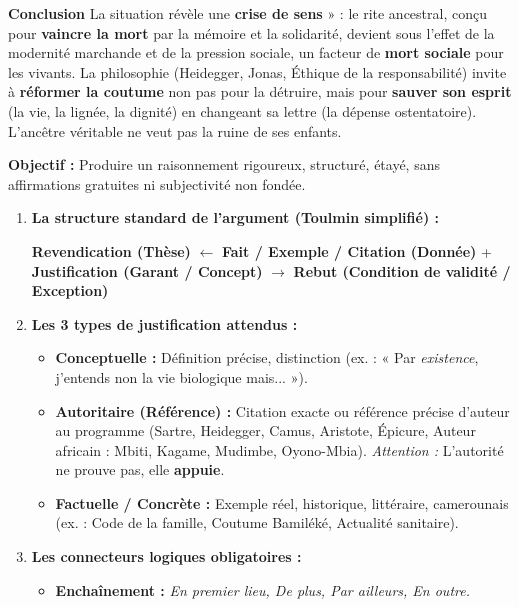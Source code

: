 \documentclass[11pt]{article}
\begin{document}
\begin{exoresolu}
\textbf{Conclusion}
La situation révèle une \textbf{crise de sens} » : le rite ancestral, conçu pour \textbf{vaincre la mort} par la mémoire et la solidarité, devient sous l'effet de la modernité marchande et de la pression sociale, un facteur de \textbf{mort sociale} pour les vivants. La philosophie (Heidegger, Jonas, Éthique de la responsabilité) invite à \textbf{réformer la coutume} non pas pour la détruire, mais pour \textbf{sauver son esprit} (la vie, la lignée, la dignité) en changeant sa lettre (la dépense ostentatoire). L'ancêtre véritable ne veut pas la ruine de ses enfants.
\end{exoresolu}

\begin{methode}
\textbf{Objectif :} Produire un raisonnement rigoureux, structuré, étayé, sans affirmations gratuites ni subjectivité non fondée.
\begin{enumerate}
    \item \textbf{La structure standard de l'argument (Toulmin simplifié) :}
    \begin{center}
    \textbf{Revendication (Thèse)} $\leftarrow$ \textbf{Fait / Exemple / Citation (Donnée)} + \textbf{Justification (Garant / Concept)} $\rightarrow$ \textbf{Rebut (Condition de validité / Exception)}
    \end{center}
    \item \textbf{Les 3 types de justification attendus :}
    \begin{itemize}
        \item \textbf{Conceptuelle :} Définition précise, distinction (ex. : « Par \emph{existence}, j'entends non la vie biologique mais... »).
        \item \textbf{Autoritaire (Référence) :} Citation exacte ou référence précise d'auteur au programme (Sartre, Heidegger, Camus, Aristote, Épicure, Auteur africain : Mbiti, Kagame, Mudimbe, Oyono-Mbia). \textit{Attention :} L'autorité ne prouve pas, elle \textbf{appuie}.
        \item \textbf{Factuelle / Concrète :} Exemple réel, historique, littéraire, camerounais (ex. : Code de la famille, Coutume Bamiléké, Actualité sanitaire).
    \end{itemize}
    \item \textbf{Les connecteurs logiques obligatoires :}
    \begin{itemize}
        \item \textbf{Enchaînement :} \emph{En premier lieu, De plus, Par ailleurs, En outre.}

\end{itemize}
\end{enumerate}
\end{methode}
\end{document}
